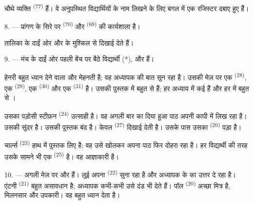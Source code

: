 चौथे व्यक्ति  \textsuperscript{(77)} हैं। वे अनुपस्थित विद्यार्थियों
के नाम लिखने के लिए बगल में एक रजिस्टर दबाए हुए हैं।

8. --- प्रांगण के सिरे पर  \textsuperscript{(70)} और
 \textsuperscript{(69)} की कार्यशाला है।

तालिका के दाईं ओर  और  के  मुश्किल
से दिखाई देते हैं।


\VUsaut{2.4mm}

\VUsaut{3.0mm}

9. --- मंच के दाईं ओर पहली बेंच पर बैठे विद्यार्थी  (*),
 और  हैं।

हेनरी बहुत ध्यान देने वाला और मेहनती है; वह अध्यापक की बात सुन रहा है। उसकी
मेज़ पर एक  \textsuperscript{(28)}, एक 
\textsuperscript{(29)}, एक  \textsuperscript{(30)} और एक
 \textsuperscript{(31)} है। उसकी पुस्तक में बहुत से 
हैं; हर अध्याय में कई  हैं और हर  में बहुत से
।

उसका पड़ोसी स्टीफ़न \textsuperscript{(24)} उत्साही है। वह अगली बार का दिया हुआ पाठ
अपनी कापी में लिख रहा है। उसकी  सुंदर है। उसकी पुस्तक बंद है।
केवल  \textsuperscript{(27)} दिखाई देती है। उसके पास उसका
 \textsuperscript{(26)} पड़ा है।

चार्ल्स \textsuperscript{(23)} हाथ में पुस्तक लिए है; वह उसे खोलकर अपना पाठ फिर
दोहरा रहा है। हर विद्यार्थी की तरह उसके सामने भी एक 
\textsuperscript{(25)} है। वह आज्ञाकारी है।

10. --- अगली मेज़ पर  और  हैं। लुई अपना
 \textsuperscript{(22)} सुना रहा है और अध्यापक के  का
उत्तर दे रहा है। एंटनी \textsuperscript{(21)} बहुत असावधान है; अध्यापक कभी-कभी उसे
दंड भी देते हैं। पॉल \textsuperscript{(20)} अच्छा मित्र है, मिलनसार और उपकारी। वह
बहुत ध्यान देता है।

